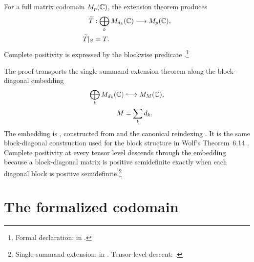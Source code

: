 \documentclass{article}
\begin{document}
For a full matrix codomain $M_{p}(\mathbb{C})$, the extension theorem produces
\begin{align}
    \widetilde T
        &:\bigoplus_kM_{d_k}(\mathbb{C})\longrightarrow M_{p}(\mathbb{C}),
    \label{eq:wolf_ch01_operator_system_extension_matrix_scope_matrix_codomain_extension}\\
    \widetilde T|_S
        &=T.
    \label{eq:wolf_ch01_operator_system_extension_matrix_scope_matrix_extension_agreement}
\end{align}
Complete positivity is expressed by the blockwise predicate
.\footnote{Formal declaration:
 in
.}

The proof transports the single-summand extension theorem along the
block-diagonal embedding
\begin{align}
    \bigoplus_k M_{d_k}(\C)
        &\lhook\joinrel\longrightarrow M_M(\C),
    \label{eq:wolf_ch01_operator_system_extension_matrix_scope_block_diagonal_embedding}\\
    M
        &=\sum_k d_k.
    \label{eq:wolf_ch01_operator_system_extension_matrix_scope_total_matrix_dimension}
\end{align}
The embedding is
, constructed from
 and the canonical reindexing
. It is the same block-diagonal construction used for
the block structure in Wolf's Theorem~6.14 \cite{Wolf2012Quantum}.
Complete positivity at every tensor level descends through the embedding
because a block-diagonal matrix is positive semidefinite exactly when each
diagonal block is positive semidefinite.\footnote{Single-summand extension:
 in
. Tensor-level descent:
.}

\section{The formalized codomain}
\end{document}
